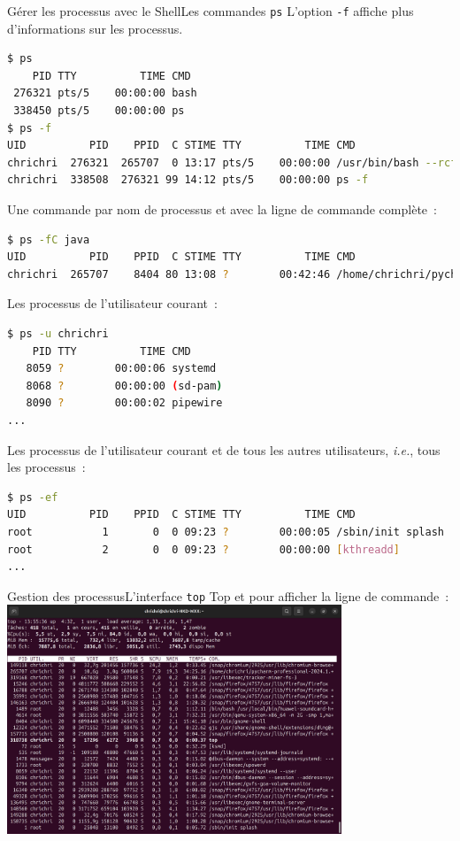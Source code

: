 \documentclass{beamer}
\begin{document}
    \begin{frame}[fragile]{Gérer les processus avec le Shell}{Les commandes \lstinline{ps}}
        L'option \lstinline{-f} affiche plus d'informations sur les processus.
        \begin{lstlisting}[language=bash,basicstyle=\tiny\ttfamily]
$ ps
    PID TTY          TIME CMD
 276321 pts/5    00:00:00 bash
 338450 pts/5    00:00:00 ps
$ ps -f
UID          PID    PPID  C STIME TTY          TIME CMD
chrichri  276321  265707  0 13:17 pts/5    00:00:00 /usr/bin/bash --rcfile /home/chrichri/pycharm-professional-2024.1.4/pycharm-2024.1.4/plugins/terminal/shell-integrations/bash/bash-integration.bash -i
chrichri  338508  276321 99 14:12 pts/5    00:00:00 ps -f
        \end{lstlisting}
        Une commande par nom de processus et avec la ligne de commande complète~:
        \begin{lstlisting}[language=bash,basicstyle=\tiny\ttfamily]
$ ps -fC java
UID          PID    PPID  C STIME TTY          TIME CMD
chrichri  265707    8404 80 13:08 ?        00:42:46 /home/chrichri/pycharm...
        \end{lstlisting}
        \bigbreak
        Les processus de l'utilisateur courant~:
        \begin{lstlisting}[language=bash,basicstyle=\tiny\ttfamily]
$ ps -u chrichri
    PID TTY          TIME CMD
   8059 ?        00:00:06 systemd
   8068 ?        00:00:00 (sd-pam)
   8090 ?        00:00:02 pipewire
...
        \end{lstlisting}
        \bigbreak
        Les processus de l'utilisateur courant et de tous les autres utilisateurs, \textit{i.e.}, tous les processus~:
        \begin{lstlisting}[language=bash,basicstyle=\tiny\ttfamily]
$ ps -ef
UID          PID    PPID  C STIME TTY          TIME CMD
root           1       0  0 09:23 ?        00:00:05 /sbin/init splash
root           2       0  0 09:23 ?        00:00:00 [kthreadd]
...
        \end{lstlisting}
    \end{frame}

    \begin{frame}{Gestion des processus}{L'interface \lstinline{top}}
        Top et  pour afficher la ligne de commande~:
        \bigbreak
        \centering
        \includegraphics[width=10cm]{image/top-interface}
    \end{frame}
\end{document}
